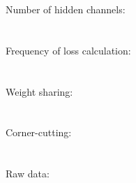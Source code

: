 \documentclass{article}
\begin{document}
Number of hidden channels:\\
\\\\

Frequency of loss calculation:\\
\\\\

Weight sharing:\\
\\\\

Corner-cutting:\\
\\\\

Raw data:\\

\end{document}
